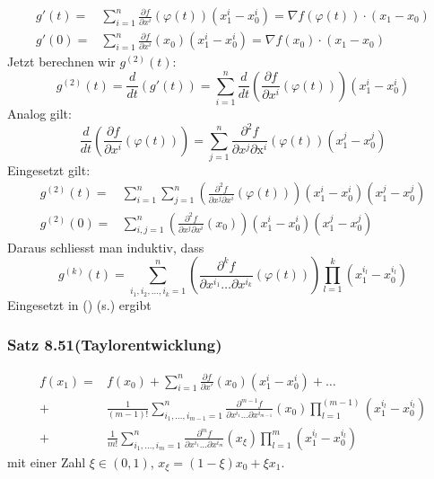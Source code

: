 \begin{align*}
g'(t) = & \sum\limits_{i = 1}^n {\frac{{\partial f}}{{\partial {x^i}}}\left( {\varphi (t)} \right)\left( {x_1^i - x_0^i} \right)}  = \nabla f\left( {\varphi (t)} \right) \cdot \left( {{x_1} - {x_0}} \right)\\
g'(0) = & \sum\limits_{i = 1}^n {\frac{{\partial f}}{{\partial {x^i}}}\left( {x_0} \right)\left( {x_1^i - x_0^i} \right)}  = \nabla f\left( {x_0} \right) \cdot \left( {{x_1} - {x_0}} \right)
\end{align*}
Jetzt berechnen wir $g^{(2)}(t)$:\[{g^{(2)}}(t) = \frac{d}{{dt}}\left( {g'\left( t \right)} \right) = \sum\limits_{i = 1}^n {\frac{d}{{dt}}\left( {\frac{{\partial f}}{{\partial {x^i}}}\left( {\varphi \left( t \right)} \right)} \right)} \left( {x_1^i - x_0^i} \right)\]
Analog gilt:
\[\frac{d}{{dt}}\left( {\frac{{\partial f}}{{\partial {x^i}}}\left( {\varphi \left( t \right)} \right)} \right) = \sum\limits_{j = 1}^n {\frac{{{\partial ^2}f}}{{\partial {x^j}\partial {{\text{x}}^i}}}\left( {\varphi \left( t \right)} \right)\left( {x_1^j - x_0^j} \right)} \]
Eingesetzt gilt:
\begin{align*}
{g^{(2)}}(t) = & \sum\limits_{i = 1}^n {\sum\limits_{j = 1}^n {\left( {\frac{{{\partial ^2}f}}{{\partial {x^j}\partial {x^i}}}\left( {\varphi (t)} \right)} \right)} } \left( {x_1^i - x_0^i} \right)\left( {x_1^j - x_0^j} \right)\\
{g^{(2)}}(0) = & \sum\limits_{i,j = 1}^n {\left( {\frac{{{\partial ^2}f}}{{\partial {x^j}\partial {x^i}}}\left( {{x_0}} \right)} \right)} \left( {x_1^i - x_0^i} \right)\left( {x_1^j - x_0^j} \right)
\end{align*}
Daraus schliesst man induktiv, dass
\[{g^{(k)}}(t) = \sum\limits_{{i_1},{i_2}, \ldots ,{i_k} = 1}^n {\left( {\frac{{{\partial ^k}f}}{{\partial {x^{{i_1}}} \ldots \partial {x^{{i_k}}}}}\left( {\varphi (t)} \right)} \right)} \prod\limits_{l = 1}^k {\left( {x_1^{{i_l}} - x_0^{{i_l}}} \right)} \]
Eingesetzt in (\textasteriskcentered) (s.\pageref{Chap8Equation,Taylor}) ergibt 

\subsubsection*{Satz 8.51(Taylorentwicklung)}
\begin{align*}
f\left( {{x_1}} \right) = & f\left( {{x_0}} \right) + \sum\limits_{i = 1}^n {\frac{{\partial f}}{{\partial x'}}\left( {{x_0}} \right)\left( {x_1^i - x_0^i} \right) +  \ldots } \\
 + & \frac{1}{{\left( {m - 1} \right)!}}\sum\limits_{{i_1}, \ldots ,{i_{m - 1}} = 1}^n {\frac{{{\partial ^{m - 1}}f}}{{\partial {x^{{i_1}}} \ldots \partial {x^{{i_{m - 1}}}}}}\left( {{x_0}} \right)\prod\limits_{l = 1}^{\left( {m - 1} \right)} {\left( {x_1^{{i_l}} - x_0^{{i_l}}} \right)} } \\
 + & \frac{1}{{m!}}\sum\limits_{{i_1}, \ldots ,{i_m} = 1}^n {\frac{{{\partial ^m}f}}{{\partial {x^{{i_1}}} \ldots \partial {x^{{i_m}}}}}\left( {{x_\xi }} \right)\prod\limits_{l = 1}^m {\left( {x_1^{{i_l}} - x_0^{{i_l}}} \right)} }
\end{align*}
mit einer Zahl $\xi\in\left( 0,1\right)$, $x_\xi = \left( 1-\xi\right)x_0+\xi x_1$.

